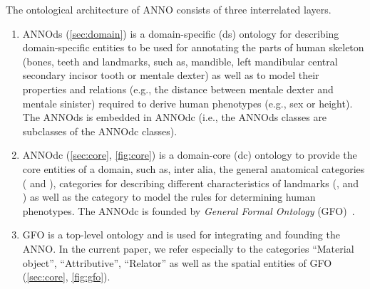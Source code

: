 \documentclass[sw]{iosart2x}
\newcommand{\aw}{AnthroWorks3D}
\begin{document}
The ontological architecture of ANNO consists of three interrelated layers.

\begin{enumerate}
  
  \item ANNOds (\cref{sec:domain}) is a domain-specific (ds) ontology for describing domain-specific entities to be used for annotating 
the parts of human skeleton (bones, teeth and landmarks, such as, mandible, left mandibular central secondary incisor tooth 
or mentale dexter) as well as to model their properties and relations (e.g., the distance between mentale dexter and mentale sinister) 
required to derive human phenotypes (e.g., sex or height). The ANNOds is embedded in ANNOdc 
(i.e., the ANNOds classes are subclasses of the ANNOdc classes).
  
  \item ANNOdc (\cref{sec:core}, \cref{fig:core}) is a domain-core (dc) ontology to provide the core entities of a domain, such as, inter alia, 
the general anatomical categories ( and ), categories for describing different characteristics of 
landmarks (,  and ) as well as 
the category  to model the rules for determining human phenotypes. The ANNOdc is founded by \emph{General Formal Ontology} (GFO)~\citep{gfo}.
  
  \item GFO is a top-level ontology and is used for integrating and founding the ANNO. In the current paper, we refer especially to the categories 
\enquote{Material object}, \enquote{Attributive}, \enquote{Relator} as well as the spatial entities of GFO (\cref{sec:core}, \cref{fig:gfo}).
\end{enumerate}
\end{document}
